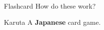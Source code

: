 \documentclass[avery5371,frame]{flashcards}
\begin{document}
\begin{flashcard}[Yomifuda]{Flashcard }
 How do these work?
\end{flashcard}

\begin{flashcard}[Yomifuda]{Karuta }
 A {\bf Japanese} card game.
\end{flashcard}
\end{document}
